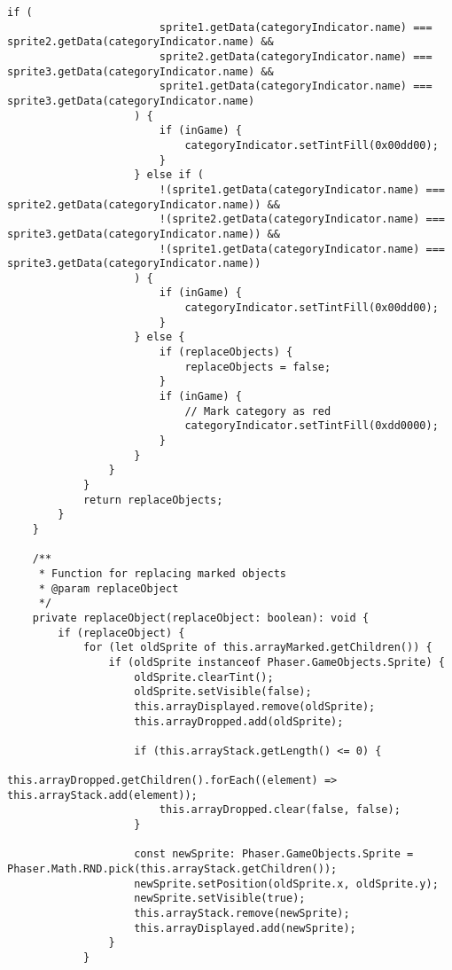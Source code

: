 \begin{lstlisting}[style=TypeScript, caption={gameScene.ts}]
                    if (
                        sprite1.getData(categoryIndicator.name) === sprite2.getData(categoryIndicator.name) &&
                        sprite2.getData(categoryIndicator.name) === sprite3.getData(categoryIndicator.name) &&
                        sprite1.getData(categoryIndicator.name) === sprite3.getData(categoryIndicator.name)
                    ) {
                        if (inGame) {
                            categoryIndicator.setTintFill(0x00dd00);
                        }
                    } else if (
                        !(sprite1.getData(categoryIndicator.name) === sprite2.getData(categoryIndicator.name)) &&
                        !(sprite2.getData(categoryIndicator.name) === sprite3.getData(categoryIndicator.name)) &&
                        !(sprite1.getData(categoryIndicator.name) === sprite3.getData(categoryIndicator.name))
                    ) {
                        if (inGame) {
                            categoryIndicator.setTintFill(0x00dd00);
                        }
                    } else {
                        if (replaceObjects) {
                            replaceObjects = false;
                        }
                        if (inGame) {
                            // Mark category as red
                            categoryIndicator.setTintFill(0xdd0000);
                        }
                    }
                }
            }
            return replaceObjects;
        }
    }

    /**
     * Function for replacing marked objects
     * @param replaceObject
     */
    private replaceObject(replaceObject: boolean): void {
        if (replaceObject) {
            for (let oldSprite of this.arrayMarked.getChildren()) {
                if (oldSprite instanceof Phaser.GameObjects.Sprite) {
                    oldSprite.clearTint();
                    oldSprite.setVisible(false);
                    this.arrayDisplayed.remove(oldSprite);
                    this.arrayDropped.add(oldSprite);

                    if (this.arrayStack.getLength() <= 0) {
                        this.arrayDropped.getChildren().forEach((element) => this.arrayStack.add(element));
                        this.arrayDropped.clear(false, false);
                    }

                    const newSprite: Phaser.GameObjects.Sprite = Phaser.Math.RND.pick(this.arrayStack.getChildren());
                    newSprite.setPosition(oldSprite.x, oldSprite.y);
                    newSprite.setVisible(true);
                    this.arrayStack.remove(newSprite);
                    this.arrayDisplayed.add(newSprite);
                }
            }


\end{lstlisting}
